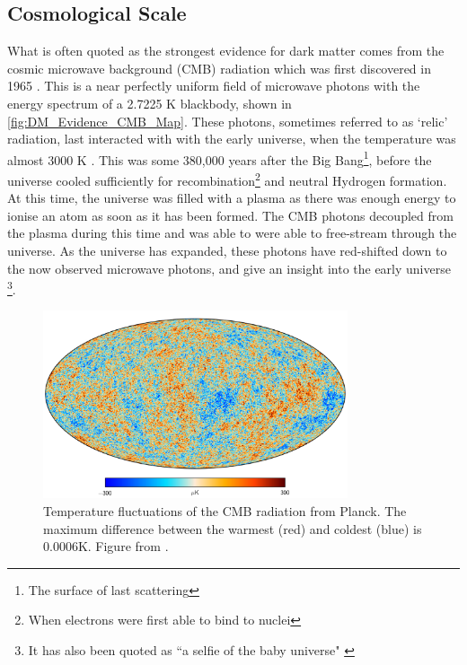 \subsection{Cosmological Scale}
\par


\par
What is often quoted as the strongest evidence for dark matter comes from the cosmic microwave background (CMB) radiation which was first discovered in 1965 \cite{cmb_origins_ref}.
This is a near perfectly uniform field of microwave photons with the energy spectrum of a 2.7225 K blackbody, shown in \autoref{fig:DM_Evidence_CMB_Map}.
These photons, sometimes referred to as `relic' radiation, last interacted with with the early universe, when the temperature was almost 3000 K \cite{bigbang_nucleosynthesis_ref}.
This was some 380,000 years after the Big Bang\footnote{The surface of last scattering}, before the universe cooled sufficiently for recombination\footnote{When electrons were first able to bind to nuclei} and neutral Hydrogen formation.
At this time, the universe was filled with a plasma as there was enough energy to ionise an atom as soon as it has been formed.
The CMB photons decoupled from the plasma during this time and was able to were able to free-stream through the universe.
As the universe has expanded, these photons have red-shifted down to the now observed microwave photons, and give an insight into the early universe \footnote{It has also been quoted as ``a selfie of the baby universe" \cite{marisarthurs_thesis_ref}}.

\begin{figure}[!htbp]%
    \centering
    \includegraphics[width=0.8\textwidth]{Figures/DarkMatterEvidence/cmb_radiation.png}
    \caption[Temperature fluctuations of the CMB radiation]{Temperature fluctuations of the CMB radiation from Planck.
             The maximum difference between the warmest (red) and coldest (blue) is 0.0006K.
             Figure from \cite{plank_result_ref}.}
    \label{fig:DM_Evidence_CMB_Map}
\end{figure}

